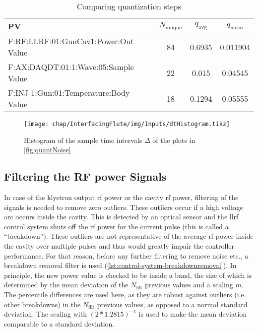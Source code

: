 \begin{table}[H]
\caption{Comparing quantization steps}\label{tab:interfacingFlute_quantSteps}
\centering
\begin{tabular}{lSSS}
\toprule
PV & {$N_\text{unique}$} & {$q_\text{avg}$} & {$q_\text{norm}$}\\
\midrule
F:RF:LLRF:01:GunCav1:Power:Out Value  & 84 & 0.6935 & 0.011904\\
F:AX:DAQDT:01:1:Wave:05:Sample Value  & 22 & 0.015  & 0.04545\\
F:INJ-1:Gun:01:Temperature:Body Value & 18 & 0.1294 & 0.05555\\
\bottomrule
\end{tabular}
\end{table}

\begin{figure}[H]
\centering
\texttt{[image: chap/InterfacingFlute/img/Inputs/dtHistogram.tikz]}
\caption[Histogram of EPICS CA sample times]{Histogram of the sample time intervals $\Delta$ of the plots in \autoref{fig:quantNoise}}
\label{fig:interfacingFlute_sampleTimesHist}
\end{figure}

\subsection{Filtering the RF power Signals}
In case of the klystron output \gls{rf} power or the cavity \gls{rf} power, filtering of the signals is needed to remove zero outliers.
These outliers occur if a high voltage arc occurs inside the cavity. This is detected by an optical sensor and the \gls{llrf} control system shuts off the \gls{rf} power for the current pulse (this is called a ``breakdown'').
These outliers are not representative of the average \gls{rf} power inside the cavity over multiple pulses and thus would greatly impair the controller performance.
For that reason, before any further filtering to remove noise etc., a breakdown removal filter is used (\autoref{lst:control-system-breakdownremoval}).
In principle, the new power value is checked to be inside a band, the size of which is determined by the mean deviation of the $N_\text{filt}$ previous values and a scaling $m$.
The percentile differences are used here, as they are robust against outliers (i.e. other breakdowns) in the $N_\text{filt}$ previous values, as opposed to a normal standard deviation.
The scaling with $(2*1.2815)^{-1}$ is used to make the mean deviation comparable to a standard deviation.

